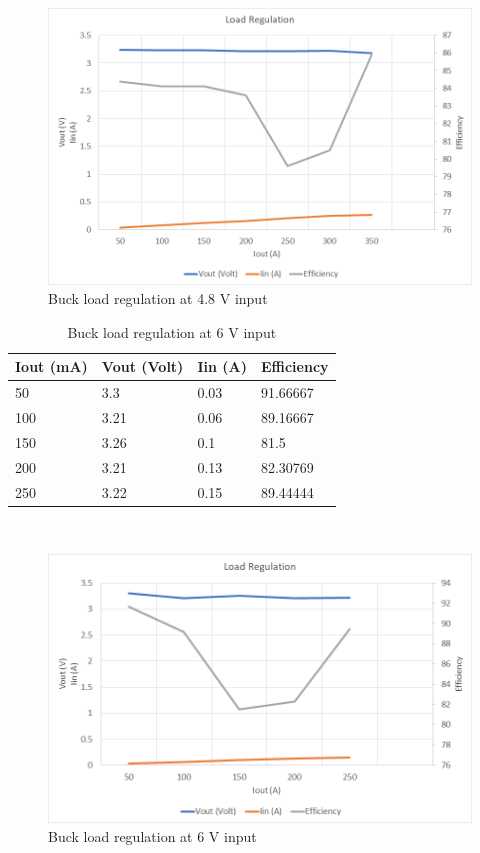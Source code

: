 \\
\begin{figure}[H]
	\centering
	\includegraphics[width=\columnwidth]{IMGS/Buck load regulation at 4.8V input.png}
	\caption{Buck load regulation at 4.8 V input}
	\label{fig:arch}
\end{figure}
\begin{table}[H]
\centering
\begin{tabular}{|l|l|l|l|}
\hline
Iout (mA) & Vout (Volt) & Iin (A) & Efficiency \\ \hline
50        & 3.3         & 0.03    & 91.66667   \\ \hline
100       & 3.21        & 0.06    & 89.16667   \\ \hline
150       & 3.26        & 0.1     & 81.5       \\ \hline
200       & 3.21        & 0.13    & 82.30769   \\ \hline
250       & 3.22        & 0.15    & 89.44444   \\ \hline
\end{tabular}
\caption{Buck load regulation at 6 V input}
\label{table:4}
\end{table}
\\
\begin{figure}[H]
	\centering
	\includegraphics[width=\columnwidth]{IMGS/Buck load regulation at 6V input.png}
	\caption{Buck load regulation at 6 V input}
	\label{fig:arch}
\end{figure}

